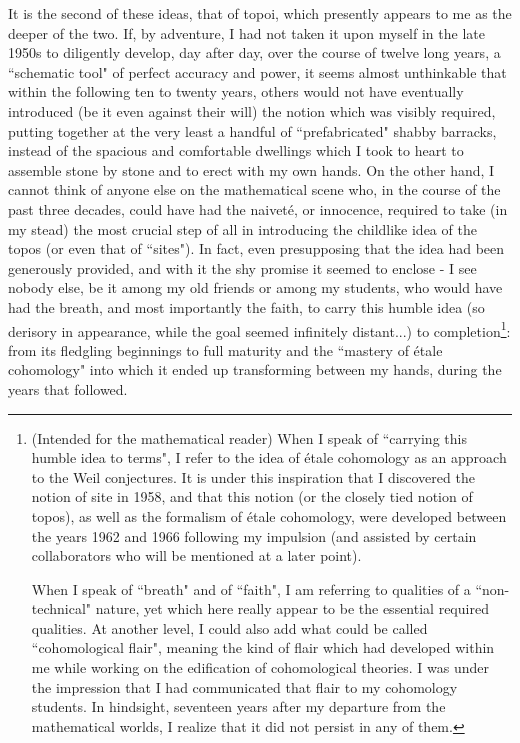 It is the second of these ideas, that of topoi, which presently appears to me as the deeper of the two. If, by adventure, I had not taken it upon myself in the late 1950s to diligently develop, day after day, over the course of twelve long years, a ``schematic tool" of perfect accuracy and power, it seems almost unthinkable that within the following ten to twenty years, others would not have eventually introduced (be it even against their will) the notion which was visibly required, putting together at the very least a handful of ``prefabricated" shabby barracks, instead of the spacious and comfortable dwellings which I took to heart to assemble stone by stone and to erect with my own hands. On the other hand, I cannot think of anyone else on the mathematical scene who, in the course of the past three decades, could have had the naivet\'e, or innocence, required to take (in my stead) the most crucial step of all in introducing the childlike idea of the topos (or even that of ``sites"). In fact, even presupposing that the idea had been generously provided, and with it the shy promise it seemed to enclose - I see nobody else, be it among my old friends or among my students, who would have had the breath, and most importantly the faith, to carry this humble idea (so derisory in appearance, while the goal seemed infinitely distant...) to completion\footnote{(Intended for the mathematical reader) When I speak of ``carrying this humble idea to terms", I refer to the idea of \'etale cohomology as an approach to the Weil conjectures. It is under this inspiration that I discovered the notion of site in 1958, and that this notion (or the closely tied notion of topos), as well as the formalism of \'etale cohomology, were developed between the years 1962 and 1966 following my impulsion (and assisted by certain collaborators who will be mentioned at a later point).

When I speak of ``breath" and of ``faith", I am referring to qualities of a ``non-technical" nature, yet which here really appear to be the essential required qualities. At another level, I could also add what could be called ``cohomological flair", meaning the kind of flair which had developed within me while working on the edification of cohomological theories. I was under the impression that I had communicated that flair to my cohomology students. In hindsight, seventeen years after my departure from the mathematical worlds, I realize that it did not persist in any of them.}: from its fledgling beginnings to full maturity and the ``mastery of \'etale cohomology" into which it ended up transforming between my hands, during the years that followed.

